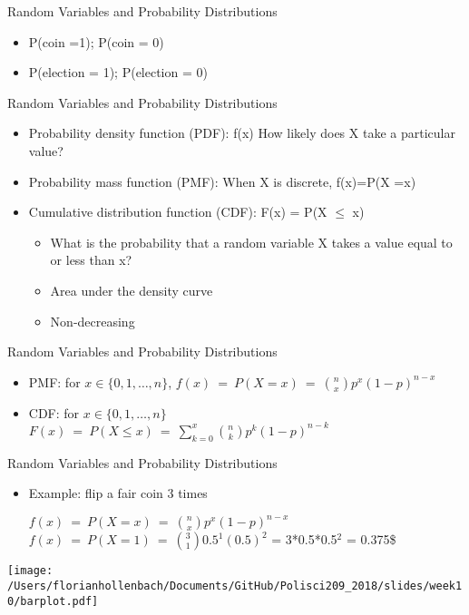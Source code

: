 \documentclass[presentation]{beamer}
\begin{document}
\begin{frame}[label={sec:orgf5e0cb0}]{Random Variables and Probability Distributions}
\begin{itemize}
\item P(coin =1); P(coin = 0)
\item P(election = 1); P(election = 0)
\end{itemize}
\end{frame}


\begin{frame}[label={sec:org40178b0}]{Random Variables and Probability Distributions}
\begin{itemize}
\item \alert{Probability density function (PDF)}: f(x) How likely does X take a particular value?
\item \alert{Probability mass function (PMF)}: When X is discrete, f(x)=P(X =x)
\end{itemize}

\pause

\begin{itemize}
\item \alert{Cumulative distribution function (CDF)}: F(x) = P(X \(\leq\) x)
\begin{itemize}
\item What is the probability that a random variable X takes a value equal to or less than x?
\item Area under the density curve
\item Non-decreasing
\end{itemize}
\end{itemize}
\end{frame}


\begin{frame}[label={sec:org15729b7}]{Random Variables and Probability Distributions}
\begin{itemize}
\item \alert{PMF}: for \(x \in \{0, 1, \dots, n\}\),
\(f(x) \ = \ P(X = x) \ = \ {n \choose x} p^x (1-p)^{n-x}\)

\item \alert{CDF}: for \(x \in \{0, 1, \dots, n\}\)
\(F(x) \ = \ P(X \le x) \ = \ \sum_{k = 0}^x {n\choose k} p^k (1-p)^{n-k}\)
\end{itemize}
\end{frame}



\begin{frame}[label={sec:org5164f3e}]{Random Variables and Probability Distributions}
\begin{itemize}
\item Example: flip a fair coin 3 times

\(f(x) \ = \ P(X = x) \ = \ {n \choose x} p^x (1-p)^{n-x}\)
\(f(x) \ = \ P(X = 1) \ = \ {3 \choose 1} 0.5^1 (0.5)^{2}\) = 3*0.5*0.5\(^{\text{2}}\) = 0.375\$
\end{itemize}


\begin{center}
\texttt{[image: /Users/florianhollenbach/Documents/GitHub/Polisci209\_2018/slides/week10/barplot.pdf]}
\end{center}
\end{frame}
\end{document}
